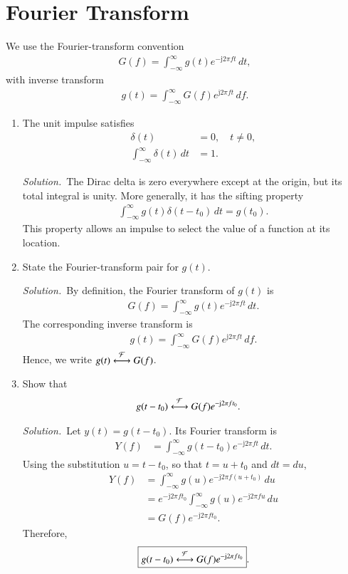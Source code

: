 \documentclass[journal,12pt,twocolumn]{IEEEtran}
\renewcommand\thesection{\arabic{section}}
\newcommand{\jj}{\mathrm{j}}
\providecommand{\solution}{\par\noindent\textit{Solution.}\ }
\begin{document}
\section{Fourier Transform}

We use the Fourier-transform convention
\begin{align}
    G(f)=\int_{-\infty}^{\infty}g(t)e^{-\jj2\pi ft}\,dt,
    \label{eq:ft-definition}
\end{align}
with inverse transform
\begin{align}
    g(t)=\int_{-\infty}^{\infty}G(f)e^{\jj2\pi ft}\,df.
\end{align}

\begin{enumerate}[label=\thesection.\arabic*,ref=\thesection.\theenumi]

\item The unit impulse satisfies
\begin{align}
    \delta(t)&=0,\quad t\neq 0,\\
    \int_{-\infty}^{\infty}\delta(t)\,dt&=1.
\end{align}

\solution The Dirac delta is zero everywhere except at the origin, but its total integral is unity. More generally, it has the sifting property
\begin{align}
    \int_{-\infty}^{\infty}g(t)\delta(t-t_0)\,dt=g(t_0).
\end{align}
This property allows an impulse to select the value of a function at its location.

\item State the Fourier-transform pair for $g(t)$.

\solution By definition, the Fourier transform of $g(t)$ is
\begin{align}
    G(f)=\int_{-\infty}^{\infty}g(t)e^{-\jj2\pi ft}\,dt.
\end{align}
The corresponding inverse transform is
\begin{align}
    g(t)=\int_{-\infty}^{\infty}G(f)e^{\jj2\pi ft}\,df.
\end{align}
Hence, we write $g(t)\overset{\mathcal{F}}{\longleftrightarrow}G(f)$.

\item Show that
\begin{align}
    g(t-t_0)&\system{F}G(f)e^{-\jj2\pi ft_0}.
\end{align}

\solution Let $y(t)=g(t-t_0)$. Its Fourier transform is
\begin{align}
    Y(f)&=\int_{-\infty}^{\infty}g(t-t_0)e^{-\jj2\pi ft}\,dt.
\end{align}
Using the substitution $u=t-t_0$, so that $t=u+t_0$ and $dt=du$,
\begin{align}
    Y(f)&=\int_{-\infty}^{\infty}g(u)e^{-\jj2\pi f(u+t_0)}\,du\\
    &=e^{-\jj2\pi ft_0}\int_{-\infty}^{\infty}g(u)e^{-\jj2\pi fu}\,du\\
    &=G(f)e^{-\jj2\pi ft_0}.
\end{align}
Therefore,
\begin{align}
    \boxed{g(t-t_0)\system{F}G(f)e^{-\jj2\pi ft_0}}.
\end{align}


\end{enumerate}
\end{document}
